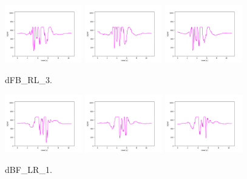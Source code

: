 \begin{figure}[!ht]
\begin{center}
\includegraphics[width=0.3\textwidth]{../data/dFB_RL_3/dFB_RL_3_1.png}
\includegraphics[width=0.3\textwidth]{../data/dFB_RL_3/dFB_RL_3_2.png}
\includegraphics[width=0.3\textwidth]{../data/dFB_RL_3/dFB_RL_3_3.png}
\caption{dFB\_RL\_3.\label{fig:dFB_RL_3}}
\end{center}
\end{figure}


\begin{figure}[!ht]
\begin{center}
\includegraphics[width=0.3\textwidth]{../data/dBF_LR_1/dBF_LR_1_1.png}
\includegraphics[width=0.3\textwidth]{../data/dBF_LR_1/dBF_LR_1_2.png}
\includegraphics[width=0.3\textwidth]{../data/dBF_LR_1/dBF_LR_1_3.png}
\caption{dBF\_LR\_1.\label{fig:dBF_LR_1}}
\end{center}
\end{figure}

